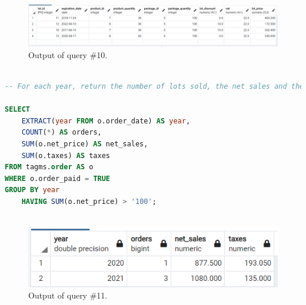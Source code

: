 \begin{figure}[h!]
	\centering
	\includegraphics[width=\linewidth]{images/q10}
	\caption{Output of query \#10.}
	\label{fig:q10}
\end{figure}

\begin{lstlisting}[language=SQL,
	keywordstyle=\color{blue},
	stringstyle=\color{mauve},
	showstringspaces=false,
	breaklines=true,
	basicstyle=\ttfamily\footnotesize]

-- For each year, return the number of lots sold, the net sales and the added taxes paid by the customers

SELECT
    EXTRACT(year FROM o.order_date) AS year,
    COUNT(*) AS orders,
    SUM(o.net_price) AS net_sales,
    SUM(o.taxes) AS taxes
FROM tagms.order AS o
WHERE o.order_paid = TRUE
GROUP BY year
    HAVING SUM(o.net_price) > '100';



\end{lstlisting}

\begin{figure}[h!]
	\centering
	\includegraphics{images/q11}
	\caption{Output of query \#11.}
	\label{fig:q11}
\end{figure}

